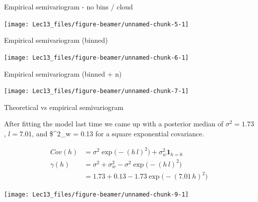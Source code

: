 \documentclass[11pt,ignorenonframetext,]{beamer}
\begin{document}
\begin{frame}{Empirical semivariogram - no bins / cloud}
\protect\hypertarget{empirical-semivariogram---no-bins-cloud}{}

\begin{center}\texttt{[image: Lec13\_files/figure-beamer/unnamed-chunk-5-1]} \end{center}

\end{frame}

\begin{frame}{Empirical semivariogram (binned)}
\protect\hypertarget{empirical-semivariogram-binned}{}

\begin{center}\texttt{[image: Lec13\_files/figure-beamer/unnamed-chunk-6-1]} \end{center}

\end{frame}

\begin{frame}{Empirical semivariogram (binned + n)}
\protect\hypertarget{empirical-semivariogram-binned-n}{}

\begin{center}\texttt{[image: Lec13\_files/figure-beamer/unnamed-chunk-7-1]} \end{center}

\end{frame}

\begin{frame}{Theoretical vs empirical semivariogram}
\protect\hypertarget{theoretical-vs-empirical-semivariogram}{}

After fitting the model last time we came up with a posterior median of
\(\sigma^2 = 1.73\), \(l=7.01\), and \$\sigma\^{}2\_w = 0.13 for a
square exponential covariance.

\pause

\scriptsize

\[ 
\begin{aligned}
Cov(h) &= \sigma^2 \exp\big(-(h\,l)^2\big) + \sigma^2_w \symbf{1}_{h=0}\\
\gamma(h) 
  &= \sigma^2 + \sigma^2_w - \sigma^2 \exp\big(-(h\,l)^2\big) \\
  &= 1.73 + 0.13 - 1.73 \exp\big(-(7.01\, h)^2\big)
\end{aligned}
\]

\pause

\begin{center}\texttt{[image: Lec13\_files/figure-beamer/unnamed-chunk-9-1]} \end{center}

\end{frame}
\end{document}
